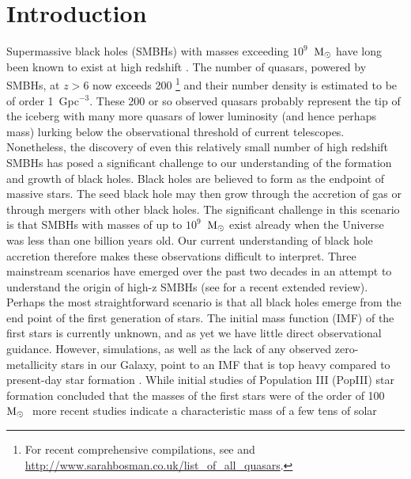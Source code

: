\documentclass[twocolumn,iop,revtex4]{openjournal}
\newcommand{\msolar} {$\rm{M_{\odot}}~$}
\begin{document}
\section{Introduction} \label{Sec:Introduction}

Supermassive black holes (SMBHs) with masses exceeding $10^{9}$~\msolar have long been known to
exist at high redshift \citep[e.g.][]{Fan_2001, Dietrich_2002, Fan_2003, Vestergaard_2004,
  Fan_2004, Fan_06}. The number of quasars, powered by SMBHs, at $z > 6$ now exceeds
200 \citep{Matsuoka_2019}\footnote{For recent comprehensive compilations, see \citet{Inayoshi_2020} and
\url{http://www.sarahbosman.co.uk/list_of_all_quasars}.}
and their number
density is estimated to be of order 1~Gpc$^{-3}$. These 200 or so observed quasars probably
represent the tip of the iceberg with many more quasars of lower luminosity (and hence perhaps mass)
lurking below the observational threshold of current telescopes. \\
\indent Nonetheless, the discovery of even this relatively small number of high redshift SMBHs
has posed a significant challenge to our understanding of the formation and growth of black holes.
Black holes are believed to form as the endpoint of massive stars. The seed black hole may then grow through the
accretion of gas or through mergers with other black holes. The significant challenge in this
scenario is that SMBHs with masses of up to $10^{9}$~\msolar exist \citep[e.g][]{Banados_2018} already when
the Universe was less than one billion years old. Our current understanding of black hole accretion
therefore makes these observations difficult to interpret. Three mainstream scenarios have
emerged over the past two decades in an attempt to understand the origin of high-z SMBHs (see \citealt{Inayoshi_2020} for a recent extended review). \\
\indent Perhaps the most straightforward scenario is that all black holes emerge from the end
point of the first generation of stars. The initial mass function (IMF) of the first stars
is currently unknown, and as yet we have little direct observational guidance. However, simulations,
as well as the lack of any observed zero-metallicity stars in our Galaxy, point to an IMF that
is top heavy compared to present-day star formation \citep{Yoshida_2006, Turk_2009,
  Clark_2011a, Hirano_2014}. While initial studies of Population III (PopIII) star formation
concluded that the masses of the first stars were of the order of 100 \msolar \citep{Bromm_1999,
  Abel_2002, Bromm_2002} more recent studies indicate a characteristic mass of a few tens of solar
\end{document}
